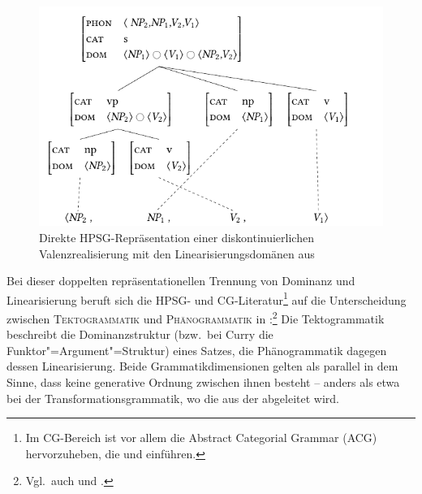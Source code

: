 \begin{figure}[t]
\centering
\includegraphics{graphics/abb64.pdf}
\caption{\label{fig-kohaerenz-strategien-2}Direkte HPSG-Repräsentation einer diskontinuierlichen Valenzrealisierung mit den Linearisierungsdomänen aus \cite{Reape:92,Reape:94,Reape:96}}
\end{figure}
 
Bei dieser doppelten repräsentationellen Trennung von Dominanz und Linearisierung beruft sich die HPSG- und CG-Literatur\footnote{Im CG-Bereich ist vor allem die Abstract Categorial Grammar (ACG) hervorzuheben, die \cite{deGroote:01} und \cite{Muskens:01} einführen.} auf die Unterscheidung zwischen \textsc{Tektogrammatik} und \textsc{Phänogrammatik} in \citet[65f]{Curry:63}:\footnote{Vgl.\ auch \citet[12ff]{Dowty:96} und \citet[35ff]{Kathol:00}.} Die Tektogrammatik beschreibt die Dominanzstruktur (bzw.\ bei Curry die Funktor"=Argument"=Struktur) eines Satzes, die Phänogrammatik dagegen dessen Linearisierung. Beide Grammatikdimensionen gelten als parallel in dem Sinne, dass keine generative Ordnung zwischen ihnen besteht -- anders als etwa bei der Transformationsgrammatik, wo die  aus der  abgeleitet wird. 


